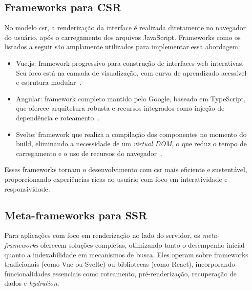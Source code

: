 \subsection{Frameworks para CSR}
\label{subsec:frameworks-csr}

No modelo \acrshort{csr}, a renderização da interface é realizada diretamente no navegador do usuário, após o carregamento dos arquivos JavaScript. Frameworks como os listados a seguir são amplamente utilizados para implementar essa abordagem:

\begin{itemize}
    \item Vue.js: framework progressivo para construção de interfaces web interativas. Seu foco está na camada de visualização, com curva de aprendizado acessível e estrutura modular~\cite{vue2025}.
    
    \item Angular: framework completo mantido pelo Google, baseado em TypeScript, que oferece arquitetura robusta e recursos integrados como injeção de dependência e roteamento~\cite{angular2025}.
    
    \item Svelte: framework que realiza a compilação dos componentes no momento do build, eliminando a necessidade de um \textit{virtual DOM}, o que reduz o tempo de carregamento e o uso de recursos do navegador~\cite{svelte2025}.
\end{itemize}

Esses frameworks tornam o desenvolvimento com \acrshort{csr} mais eficiente e sustentável, proporcionando experiências ricas ao usuário com foco em interatividade e responsividade.

\subsection{Meta-frameworks para SSR}
\label{subsec:frameworks-ssr}

Para aplicações com foco em renderização no lado do servidor, os \emph{meta-frameworks} oferecem soluções completas, otimizando tanto o desempenho inicial quanto a indexabilidade em mecanismos de busca. Eles operam sobre frameworks tradicionais (como Vue ou Svelte) ou bibliotecas (como React), incorporando funcionalidades essenciais como roteamento, pré-renderização, recuperação de dados e \textit{hydration}.

